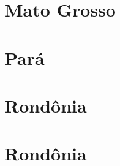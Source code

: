\documentclass[8pt]{beamer}
\begin{document}
\section{Mato Grosso}

\begin{frame}[label=amzmtcod2dig]{}
\textit{\hyperlink{indice_principal}{}}

\end{frame}

\begin{frame}[label=amzmtcnae2dig]{}
\textit{\hyperlink{indice_principal}{}}

\end{frame}

\section{Pará}

\begin{frame}[label=amzpacod2dig]{}
\textit{\hyperlink{indice_principal}{}}

\end{frame}

\begin{frame}[label=amzpacnae2dig]{}
\textit{\hyperlink{indice_principal}{}}

\end{frame}

\section{Rondônia}


\begin{frame}[label=amzrocod2dig]{}
\textit{\hyperlink{indice_principal}{}}

\end{frame}

\begin{frame}[label=amzrocnae2dig]{}
\textit{\hyperlink{indice_principal}{}}

\end{frame}

\section{Rondônia}


\begin{frame}[label=amzrrcod2dig]{}
\textit{\hyperlink{indice_principal}{}}

\end{frame}
\end{document}
